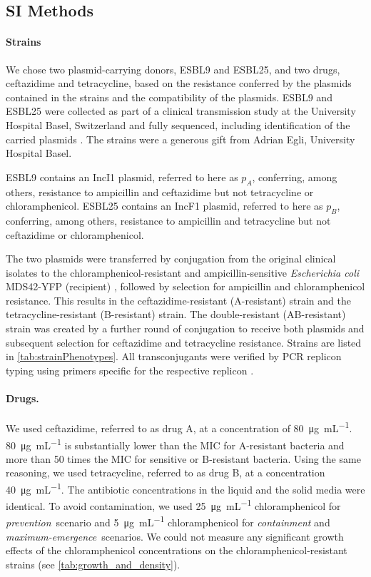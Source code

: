 \subsection{SI Methods\label{ssec:si_methods}}

\paragraph{Strains}
We chose two plasmid-carrying donors, ESBL9 and ESBL25, and two drugs, ceftazidime and tetracycline, based on the resistance conferred by the plasmids contained in the strains and the compatibility of the plasmids.
ESBL9 and ESBL25 were collected as part of a clinical transmission study at the University Hospital Basel, Switzerland \cite{Sutter2016} and fully sequenced, including identification of the carried plasmids \cite{Huisman2022}.
The strains were a generous gift from Adrian Egli, University Hospital Basel.

ESBL9 contains an IncI1 plasmid, referred to here as $p_A$, conferring, among others, resistance to ampicillin and ceftazidime but not tetracycline or chloramphenicol.
ESBL25 contains an IncF1 plasmid, referred to here as $p_B$, conferring, among others, resistance to ampicillin and tetracycline but not ceftazidime or chloramphenicol.

The two plasmids were transferred by conjugation from the original clinical isolates to the chloramphenicol-resistant and ampicillin-sensitive \textit{Escherichia coli} MDS42-YFP (recipient) \cite{Feher2012}, followed by selection for ampicillin and chloramphenicol resistance.
This results in the ceftazidime-resistant (A-resistant) strain and the tetracycline-resistant (B-resistant) strain.
The double-resistant (AB-resistant) strain was created by a further round of conjugation to receive both plasmids and subsequent selection for ceftazidime and tetracycline resistance.
Strains are listed in \autoref{tab:strainPhenotypes}.
All transconjugants were verified by PCR replicon typing using primers specific for the respective replicon \cite{Carattoli2005}.

\paragraph{Drugs.}
We used ceftazidime, referred to as drug A, at a concentration of \SI{80}{\micro\gram\per\milli\liter}.
\SI{80}{\micro\gram\per\milli\liter} is substantially lower than the MIC for A-resistant bacteria and more than 50 times the MIC for sensitive or B-resistant bacteria.
Using the same reasoning, we used tetracycline, referred to as drug B, at a concentration \SI{40}{\micro\gram\per\milli\liter}.
The antibiotic concentrations in the liquid and the solid media were identical.
To avoid contamination, we used \SI{25}{\micro\gram\per\milli\liter} chloramphenicol for \textit{prevention}~scenario and \SI{5}{\micro\gram\per\milli\liter} chloramphenicol for \textit{containment} and \textit{maximum-emergence}~scenarios.
We could not measure any significant growth effects of the chloramphenicol concentrations on the chloramphenicol-resistant strains (see \autoref{tab:growth_and_density}).

